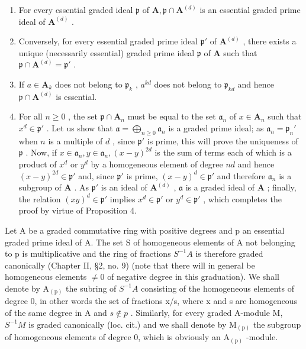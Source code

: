 \begin{enumerate}
\def\labelenumi{(\roman{enumi})}
\item
  For every essential graded ideal \(\mathfrak{p}\) of \(\mathbf{A},\mathfrak{p}\cap \mathbf{A}^{(d)}\) is an essential graded prime ideal of \(\mathbf{A}^{(d)}\) .
\item
  Conversely, for every essential graded prime ideal \(\mathfrak{p}'\) of \(\mathbf{A}^{(d)}\) , there exists a unique (necessarily essential) graded prime ideal \(\mathfrak{p}\) of \(\mathbf{A}\) such that \(\mathfrak{p} \cap \mathbf{A}^{(d)} = \mathfrak{p}'\) .
\item
  If \(a \in \mathbf{A}_k\) does not belong to \(\mathfrak{p}_k\) , \(a^{kd}\) does not belong to \(\mathfrak{p}_{kd}\) and hence \(\mathfrak{p} \cap \mathbf{A}^{(d)}\) is essential.
\item
  For all \(n \geqslant 0\) , the set \(\mathfrak{p} \cap \mathbf{A}_n\) must be equal to the set \(\mathfrak{a}_n\) of \(x \in \mathbf{A}_n\) such that \(x^d \in \mathfrak{p}'\) . Let us show that \(\mathfrak{a} = \bigoplus_{n \geqslant 0} \mathfrak{a}_n\) is a graded prime ideal; as \(\mathfrak{a}_n = \mathfrak{p}_n'\) when \(n\) is a multiple of \(d\) , since \(\mathfrak{p}'\) is prime, this will prove the uniqueness of \(\mathfrak{p}\) . Now, if \(x \in \mathfrak{a}_n, y \in \mathfrak{a}_n, (x - y)^{2d}\) is the sum of terms each of which is a product of \(x^d\) or \(y^d\) by a homogeneous element of degree \(nd\) and hence \((x - y)^{2d} \in \mathfrak{p}'\) and, since \(\mathfrak{p}'\) is prime, \((x - y)^d \in \mathfrak{p}'\) and therefore \(\mathfrak{a}_n\) is a subgroup of \(\mathbf{A}\) . As \(\mathfrak{p}'\) is an ideal of \(\mathbf{A}^{(d)}\) , \(\mathfrak{a}\) is a graded ideal of \(\mathbf{A}\) ; finally, the relation \((xy)^d \in \mathfrak{p}'\) implies \(x^d \in \mathfrak{p}'\) or \(y^d \in \mathfrak{p}'\) , which completes the proof by virtue of Proposition 4.
\end{enumerate}

Let A be a graded commutative ring with positive degrees and p an essential graded prime ideal of A. The set S of homogeneous elements of A not belonging to p is multiplicative and the ring of fractions \(S^{-1}A\) is therefore graded canonically (Chapter II, §2, no. 9) (note that there will in general be homogeneous elements \(\neq0\) of negative degree in this graduation). We shall denote by \(\mathrm{A}_{(\mathrm{p})}\) the subring of \(S^{-1}A\) consisting of the homogeneous elements of degree 0, in other words the set of fractions x/s, where x and s are homogeneous of the same degree in A and \(s\notin p\) . Similarly, for every graded A-module M, \(S^{-1}M\) is graded canonically (loc. cit.) and we shall denote by \(\mathrm{M}_{(\mathrm{p})}\) the subgroup of homogeneous elements of degree 0, which is obviously an \(\mathrm{A}_{(\mathrm{p})}\) -module.

